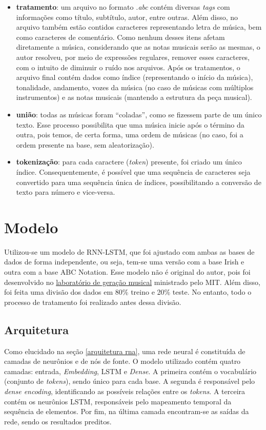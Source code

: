 \documentclass[twoside]{automatextcc}
\begin{document}
\begin{itemize}
    \item \textbf{tratamento}: um arquivo no formato \textit{.abc} contém diversas \textit{tags} com informações como título, subtítulo, autor, entre outras. Além disso, no arquivo também estão contidos caracteres representando letra de música, bem como caracteres de comentário. Como nenhum desses itens afetam diretamente a música, considerando que as notas musicais serão as mesmas, o autor resolveu, por meio de expressões regulares, remover esses caracteres, com o intuito de diminuir o ruído nos arquivos. Após os tratamentos, o arquivo final contém dados como índice (representando o início da música), tonalidade, andamento, vozes da música (no caso de músicas com múltiplos instrumentos) e as notas musicais (mantendo a estrutura da peça musical).
    \item \textbf{união}: todas as músicas foram ``coladas'', como se fizessem parte de um único texto. Esse processo possibilita que uma música inicie após o término da outra, pois temos, de certa forma, uma ordem de músicas (no caso, foi a ordem presente na base, sem aleatorização).
    \item \textbf{tokenização}: para cada caractere (\textit{token}) presente, foi criado um único índice. Consequentemente, é possível que uma sequência de caracteres seja convertido para uma sequência única de índices, possibilitando a conversão de texto para número e vice-versa.
\end{itemize}




\section{Modelo}
Utilizou-se um modelo de RNN-LSTM, que foi ajustado com ambas as bases de dados de forma independente, ou seja, tem-se uma versão com a base Irish e outra com a base ABC Notation. Esse modelo não é original do autor, pois foi desenvolvido no \href{https://goodboychan.github.io/python/tensorflow/mit/2021/02/14/music-generation.html\#The-Recurrent-Neural-Network-(RNN)-model}{laboratório de geração musical} ministrado pelo MIT. Além disso, foi feita uma divisão dos dados em 80\% treino e 20\% teste. No entanto, todo o processo de tratamento foi realizado antes dessa divisão.



\subsection{Arquitetura}
Como elucidado na seção \ref{arquitetura rna}, uma rede neural é constituída de camadas de neurônios e de nós de fonte. O modelo utilizado contém quatro camadas: entrada, \textit{Embedding}, LSTM e \textit{Dense}. A primeira contém o vocabulário (conjunto de \textit{tokens}), sendo único para cada base. A segunda é responsável pelo \textit{dense encoding}, identificando as possíveis relações entre os \textit{tokens}. A terceira contém os neurônios LSTM, responsáveis pelo mapeamento temporal da sequência de elementos. Por fim, na última camada encontram-se as saídas da rede, sendo os resultados preditos.
\end{document}
